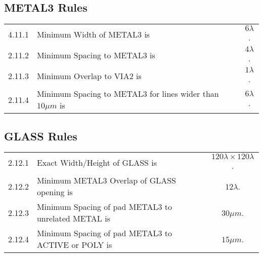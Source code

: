 \documentclass[10pt,a4paper,oneside]{article}
\newcounter{ct}
\begin{document}
\subsection{METAL3 Rules}\label{design_rules_metal3_rules}

\begin{center}
\end{center}

\begin{flushleft}
    \begin{tabular}{c l c}
        4.11.1  & Minimum Width of METAL3 is & $6 \lambda$. \\
        2.11.2  & Minimum Spacing to METAL3 is & $4 \lambda$. \\
        2.11.3  & Minimum Overlap to VIA2 is & $1 \lambda$. \\
        2.11.4  & Minimum Spacing to METAL3 for lines wider than $10 \mu m$ is & $6 \lambda$. \\
    \end{tabular}
\end{flushleft}

\subsection{GLASS Rules}\label{design_rules_glass_rules}

\begin{flushleft}
    \begin{tabular}{c l c}
	2.12.1  & Exact Width/Height of GLASS is & $ 120 \lambda \times 120 \lambda$. \\
        2.12.2  & Minimum METAL3 Overlap of GLASS opening is & $ 12 \lambda $. \\
        2.12.3  & Minimum Spacing of pad METAL3 to unrelated METAL is & $30 \mu m$. \\
        2.12.4  & Minimum Spacing of pad METAL3 to ACTIVE or POLY is & $15 \mu m$. \\
    \end{tabular}
\end{flushleft}
\end{document}
